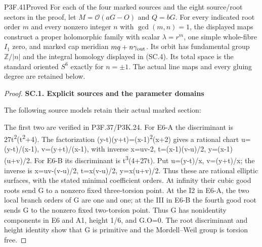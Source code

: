 \begin{statement}{P3F.41}{Proved}
For each of the four marked sources and the eight source/root sectors in the proof, let $M=\mathcal O(aG-O)$ and $Q=bG$. For every indicated root order $m$ and every nonzero integer $n$ with $\gcd(m,n)=1$, the displayed maps construct a proper holomorphic family with scalar $\lambda=r^m$, one simple whole-fibre $I_1$ zero, and marked cap meridian $mq+n\gamma_{\rm out}$. Its orbit has fundamental group $\mathbb Z/|n|$ and the integral homology displayed in \textup{(SC.4)}. Its total space is the standard oriented $S^6$ exactly for $n=\pm1$. The actual line maps and every gluing degree are retained below.
\end{statement}
\begin{proof}
\par

\medskip\noindent\textbf{SC.1. Explicit sources and the parameter domains}

The following source models retain their actual marked section:

\par{}\par\medskip

The first two are verified in P3F.37/P3K.24. For E6-A the discriminant
is 27t\textsuperscript{2}(t\textsuperscript{2}+4). The factorization
(y-t)(y+t)=(x-1)\textsuperscript{2}(x+2) gives a rational chart
u=(y-t)/(x-1), v=(y+t)/(x-1), with inverse
x=uv-2, t=(x-1)(v-u)/2, y=(x-1)(u+v)/2.
For E6-B its discriminant is t\textsuperscript{3}(4+27t). Put
u=(y-t)/x, v=(y+t)/x; the inverse is
x=uv-(v-u)/2, t=x(v-u)/2, y=x(u+v)/2.
Thus these are rational elliptic surfaces, with the stated minimal
coefficient orders. At infinity their cubic good roots send G to a
nonzero fixed three-torsion point. At the I2 in E6-A, the two local
branch orders of G are one and one; at the III in E6-B the fourth
good root sends G to the nonzero fixed two-torsion point. Thus G has
nonidentity components in E6 and A1, height 1/6, and G.O=0.
The root discriminant and height identity show that G is primitive
and the Mordell--Weil group is torsion free.


\end{proof}

